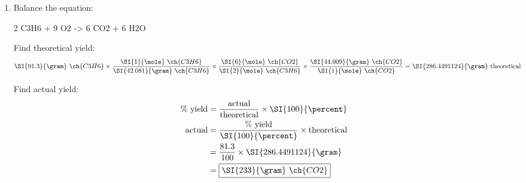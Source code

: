 \documentclass[11pt,letterpaper]{article}
\begin{document}
\begin{enumerate}[itemsep=2em,leftmargin=0pt,label=\textbf{\Alph*.}]
		\pagebreak

	\item Balance the equation:
		\begin{reaction*}
			2 C3H6\gas{} + 9 O2\gas{} -> 6 CO2\gas{} + 6 H2O\lqd{}
		\end{reaction*}

		Find theoretical yield:
		\begin{align*}
			\SI{91.3}{\gram}~\ch{C3H6} \times
			\frac{\SI{1}{\mole}~\ch{C3H6}}{\SI{42.081}{\gram}~\ch{C3H6}}
			\times
			\frac{\SI{6}{\mole}~\ch{CO2}}{\SI{2}{\mole}~\ch{C3H6}}
			\times
			\frac{\SI{44.009}{\gram}~\ch{CO2}}{\SI{1}{\mole}~\ch{CO2}}
			&= \SI{286.4491124}{\gram}~\text{theoretical}
		\end{align*}

		Find actual yield:
		\begin{align*}
			\text{\% yield} &=
			\frac{\text{actual}}{\text{theoretical}} \times
			\SI{100}{\percent} \\
			\text{actual} &= \frac{\text{\%
			yield}}{\SI{100}{\percent}} \times \text{theoretical} \\
			&= \frac{81.3}{100} \times \SI{286.4491124}{\gram} \\
			&= \boxed{\SI{233}{\gram}~\ch{CO2}}
		\end{align*}

\end{enumerate}
\end{document}

